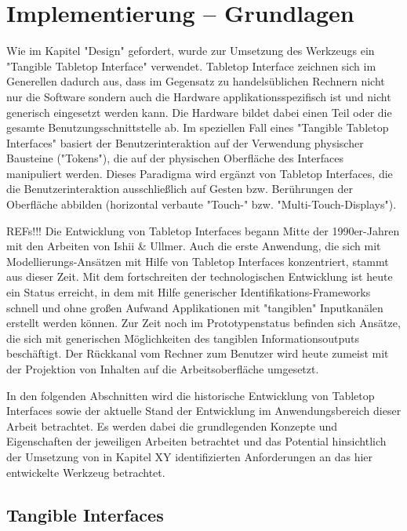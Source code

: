 \chapter{Implementierung -- Grundlagen} %
\label{cha:implementierung_Überblick}

Wie im Kapitel "Design" gefordert, wurde zur Umsetzung des Werkzeugs ein "Tangible Tabletop Interface" verwendet. Tabletop Interface zeichnen sich im Generellen dadurch aus, dass im Gegensatz zu handelsüblichen Rechnern nicht nur die Software sondern auch die Hardware applikationsspezifisch ist und nicht generisch eingesetzt werden kann. Die Hardware bildet dabei einen Teil oder die gesamte Benutzungsschnittstelle ab. Im speziellen Fall eines "Tangible Tabletop Interfaces" basiert der Benutzerinteraktion auf der Verwendung physischer Bausteine ("Tokens"), die auf der physischen Oberfläche des Interfaces manipuliert werden. Dieses Paradigma wird ergänzt von Tabletop Interfaces, die die Benutzerinteraktion ausschließlich auf Gesten bzw. Berührungen der Oberfläche abbilden (horizontal verbaute "Touch-" bzw. "Multi-Touch-Displays").

REFs!!! Die Entwicklung von Tabletop Interfaces begann Mitte der 1990er-Jahren mit den Arbeiten von Ishii \& Ullmer. Auch die erste Anwendung, die sich mit Modellierungs-Ansätzen mit Hilfe von Tabletop Interfaces konzentriert, stammt aus dieser Zeit. Mit dem fortschreiten der technologischen Entwicklung ist heute ein Status erreicht, in dem mit Hilfe generischer Identifikations-Frameworks schnell und ohne großen Aufwand Applikationen mit "tangiblen" Inputkanälen erstellt werden können. Zur Zeit noch im Prototypenstatus befinden sich Ansätze, die sich mit generischen Möglichkeiten des tangiblen Informationsoutputs beschäftigt. Der Rückkanal vom Rechner zum Benutzer wird heute zumeist mit der Projektion von Inhalten auf die Arbeitsoberfläche umgesetzt.

In den folgenden Abschnitten wird die historische Entwicklung von Tabletop Interfaces sowie der aktuelle Stand der Entwicklung im Anwendungsbereich dieser Arbeit betrachtet. Es werden dabei die grundlegenden Konzepte und Eigenschaften der jeweiligen Arbeiten betrachtet und das Potential hinsichtlich der Umsetzung von in Kapitel XY identifizierten Anforderungen an das hier entwickelte Werkzeug betrachtet. 

\section{Tangible Interfaces} %
\label{sec:tangible_interfaces}

